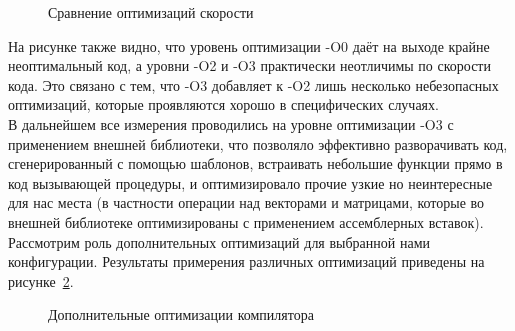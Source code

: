 \documentclass[a4paper,12pt]{report}
\numberwithin{equation}{section}
\begin{document}
\begin{figure}[!h]
\centering
{}
\caption{Сравнение оптимизаций скорости}
\label{compiler_optimize_chart}
\end{figure}

На рисунке также видно, что уровень оптимизации -O0 даёт на выходе крайне неоптимальный код, а уровни -O2 и -O3 практически неотличимы по скорости кода. Это связано с тем, что -O3 добавляет к -O2 лишь несколько небезопасных оптимизаций, которые проявляются хорошо в специфических случаях. \\
В дальнейшем все измерения проводились на уровне оптимизации -O3 с применением внешней библиотеки, что позволяло эффективно разворачивать код, сгенерированный с помощью шаблонов, встраивать небольшие функции прямо в код вызывающей процедуры, и оптимизировало прочие узкие но неинтересные для нас места (в частности операции над векторами и матрицами, которые во внешней библиотеке оптимизированы с применением ассемблерных вставок). Рассмотрим роль дополнительных оптимизаций для выбранной нами конфигурации. Результаты примерения различных оптимизаций приведены на рисунке~\ref{compiler_extra_chart}.

\begin{figure}[!h]
\centering
{}
\caption{Дополнительные оптимизации компилятора}
\label{compiler_extra_chart}
\end{figure}
\end{document}
